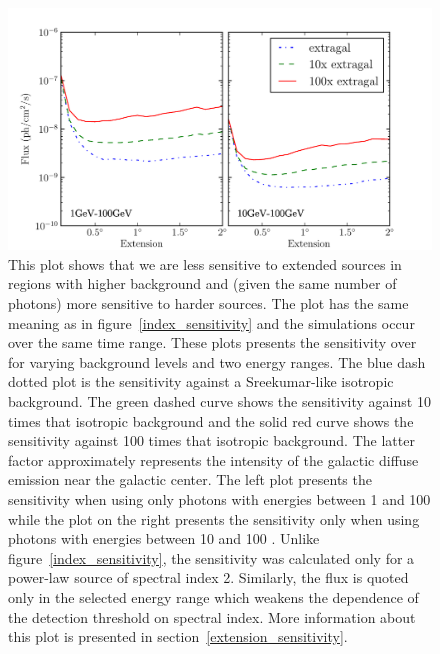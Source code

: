 \documentclass[12pt,preprint]{aastex}
\newcommand{\gev}{\text{GeV}\xspace}
\begin{document}
\clearpage

\begin{figure}
  \begin{center}
    \includegraphics{mc_plots/diff_factor_sensitivity.pdf}
    \end{center}
    \caption{
    This plot shows that we are less sensitive to extended sources in
    regions with higher background and (given the same number of photons)
    more sensitive to harder sources.  The plot has the same meaning as
    in figure~\ref{index_sensitivity} and the simulations occur over
    the same time range.  These plots presents the sensitivity over
    for varying background levels and two energy ranges.  The blue dash
    dotted plot is the sensitivity against a Sreekumar-like isotropic
    background. The green dashed curve shows the sensitivity against 10
    times that isotropic background and the solid red curve shows the
    sensitivity against 100 times that isotropic background.  The latter
    factor approximately represents the intensity of the galactic
    diffuse emission near the galactic center.  The left plot presents
    the sensitivity when using only photons with energies between 1 \gev
    and 100 \gev while the plot on the right presents the sensitivity only
    when using photons with energies between 10 \gev and 100 \gev. Unlike
    figure~\ref{index_sensitivity}, the sensitivity was calculated only
    for a power-law source of spectral index 2. Similarly, the flux is
    quoted only in the selected energy range which weakens the dependence
    of the detection threshold on spectral index.  More information
    about this plot is presented in section~\ref{extension_sensitivity}.
    }\label{diff_factor_sensitivity}
  \end{figure}
\end{document}

